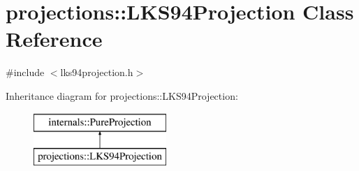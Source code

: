 \hypertarget{classprojections_1_1_l_k_s94_projection}{\section{projections\-:\-:\-L\-K\-S94\-Projection \-Class \-Reference}
\label{classprojections_1_1_l_k_s94_projection}
}


{\ttfamily \#include $<$lks94projection.\-h$>$}

\-Inheritance diagram for projections\-:\-:\-L\-K\-S94\-Projection\-:\begin{figure}[H]
\begin{center}
\leavevmode
\includegraphics[height=2.000000cm]{classprojections_1_1_l_k_s94_projection}
\end{center}
\end{figure}
